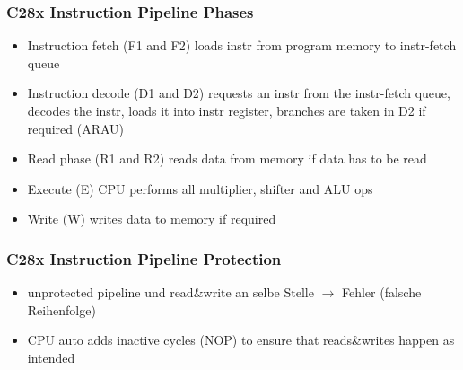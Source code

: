 \begin{minipage}{0.5\textwidth}
\subsubsection{C28x Instruction Pipeline Phases}
\begin{itemize}
  \item Instruction fetch (F1 and F2) loads instr from program memory to instr-fetch queue
  \vspace{-0.8\baselineskip}
  \item Instruction decode (D1 and D2) requests an instr from the instr-fetch queue, decodes the instr, loads it into instr register, branches are taken in D2 if required (ARAU)
  \vspace{-0.8\baselineskip}
  \item Read phase (R1 and R2) reads data from memory if data has to be read
  \vspace{-0.8\baselineskip}
  \item Execute (E) CPU performs all multiplier, shifter and ALU ops
  \vspace{-0.8\baselineskip}
  \item Write (W) writes data to memory if required
\end{itemize}
 \vspace{-0.8\baselineskip}
 \subsubsection{C28x Instruction Pipeline Protection}
 \vspace{-0.8\baselineskip}
 \begin{itemize}
 \item unprotected pipeline und read\&write an selbe Stelle $\rightarrow$ Fehler (falsche Reihenfolge)
  \vspace{-0.8\baselineskip}
 \item CPU auto adds inactive cycles (NOP) to ensure that reads\&writes happen as intended
  \vspace{-0.8\baselineskip}
\end{itemize}
\end{minipage}

